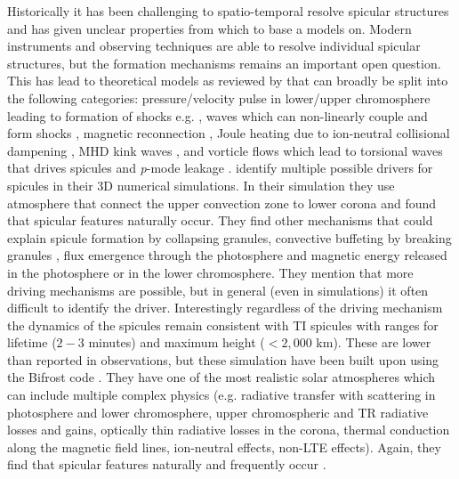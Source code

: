 Historically it has been challenging to spatio-temporal resolve spicular structures and has given unclear properties from which to base a models on. Modern instruments and observing techniques are able to resolve individual spicular structures, but the formation mechanisms remains an important open question. This has lead to theoretical models as reviewed by \cite{Sterling_2000SoPh} that can broadly be split into the following categories: pressure/velocity pulse in lower/upper chromosphere leading to formation of shocks e.g. \citep{Shibata1982,Suematsu1982SoPh7599S,Hollweg1982ApJ257345H,Sterling1990ApJ349647S,Heggland2007ApJ6661277H,kuzma2017ApJ84978K}, \Alfven waves which can non-linearly couple and form shocks \citep{Hollweg1982SoPh7535H,Hollweg1992ApJ389731H,Kudoh1999ApJ514493K,Matsumoto2010ApJ7101857M}, magnetic reconnection \citep{Yokoyama1995Natur37542Y,Yokoyama1996PASJ48353Y,Archontis2005ApJ6351299A,Pontieu2007PASJ,Isobe2008ApJ679L57I,Nishizuka2008ApJ683L83N,Sterling2010ApJ,Gonz2017ApJ,Gonz2018arXiv180704224G,Gonz2018ApJ856176G}, Joule heating due to ion-neutral collisional dampening \citep{Haerendel1992Natur360241H,James2003AA}, MHD kink waves \citep{Kukhianidze2006A&A}, and vorticle flows which lead to torsional \Alfven waves that drives spicules \citep{Iijima2017ApJ,Samanta2019Sci} and \textit{p}-mode leakage \citep{Pontieu2004Natur}. \cite{Mart2009ApJ7011569M} identify multiple possible drivers for spicules in their 3D numerical simulations. In their simulation they use atmosphere that connect the upper convection zone to lower corona and found that spicular features naturally occur. They find other mechanisms that could explain spicule formation by collapsing granules, convective buffeting by breaking granules \citep{Roberts1979SoPh6123R}, flux emergence through the photosphere and magnetic energy released in the photosphere or in the lower chromosphere. They mention that more driving mechanisms are possible, but in general (even in simulations) it often difficult to identify the driver. Interestingly regardless of the driving mechanism the dynamics of the spicules remain consistent with TI spicules with ranges for lifetime ($2-3$ minutes) and maximum height ($<2,000$ km). These are lower than reported in observations, but these simulation have been built upon \citep{Mart2017Sci3561269M,Mart2018ApJ860116M,Mart2020ApJ88995M} using the Bifrost code \citep{Gudiksen2011AA531A154G}. They have one of the most realistic solar atmospheres which can include multiple complex physics (e.g. radiative transfer with scattering in photosphere and lower chromosphere, upper chromospheric and TR radiative losses and gains, optically thin radiative losses in the corona, thermal conduction along the magnetic field lines, ion-neutral effects, non-LTE effects). Again, they find that spicular features naturally and frequently occur \citep{Mart2017Sci3561269M}. \np
